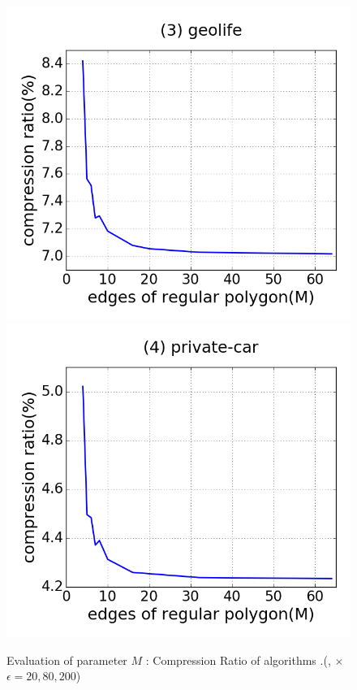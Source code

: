 \begin{figure}[tb!]
\includegraphics[scale = 0.25]{figures/Exp-M-cr-geolife.png}
\includegraphics[scale = 0.25]{figures/Exp-M-cr-private.png}
\vspace{-2ex}
\caption{\small Evaluation of parameter $M$ : Compression Ratio of algorithms \cist.(\rpia, \cpia $\times$ $\epsilon = 20, 80, 200$)}
\label{fig:m-cr-cist}
\vspace{-1ex}
\end{figure}

